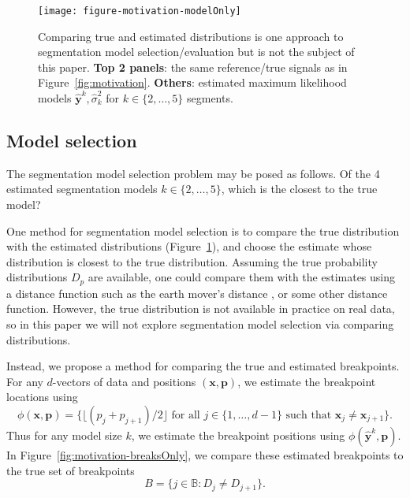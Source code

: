 \documentclass{article}
\begin{document}
\begin{figure}[H]
  \centering
  \texttt{[image: figure-motivation-modelOnly]}
  \vskip -0.5cm
  \caption{Comparing true and estimated distributions is one approach
    to segmentation model selection/evaluation but is not the subject
    of this paper. \textbf{Top 2 panels}: the same reference/true
    signals as in Figure~\ref{fig:motivation}. \textbf{Others}:
    estimated maximum likelihood models $\mathbf{\hat y}^k,\hat
    \sigma^2_k$ for $k\in\{2, \dots, 5\}$ segments.}
  \label{fig:motivation-modelOnly}
\end{figure}

\subsection{Model selection}

The segmentation model selection problem may be posed as follows. Of
the 4 estimated segmentation models $k\in\{2, \dots, 5\}$, which is
the closest to the true model?

\newpage

One method for segmentation model selection is to compare the true
distribution with the estimated distributions
(Figure~\ref{fig:motivation-modelOnly}), and choose the estimate whose
distribution is closest to the true distribution. Assuming the true
probability distributions $D_p$ are available, one could compare them
with the estimates using a distance function such as the earth mover's
distance \citep{earth-mover}, or some other distance
function. However, the true distribution is not available in practice
on real data, so in this paper we will not explore segmentation model
selection via comparing distributions.

Instead, we propose a method for comparing the true and estimated
breakpoints. For any $d$-vectors of data and positions $(\mathbf x,
\mathbf p)$, we estimate the breakpoint locations using
\begin{equation}
  \label{eq:breaks_phi}
\phi(\mathbf{x}, \mathbf p)
= \big\{
\lfloor 
(p_j+p_{j+1})/2
\rfloor
\text{ for all }j\in\{1,\dots,d-1\}\text{ such that }
\mathbf x_j\neq \mathbf x_{j+1}
\big\}.
\end{equation}
Thus for any model size $k$, we estimate the breakpoint positions
using $\phi(\mathbf{\hat y}^k, \mathbf p)$.
In Figure~\ref{fig:motivation-breaksOnly}, we compare
these estimated breakpoints to the true set of breakpoints
\begin{equation}
  \label{eq:breaks_B}
  B = \{j\in\mathbb B:D_j\neq D_{j+1}\}.
\end{equation}
\end{document}
